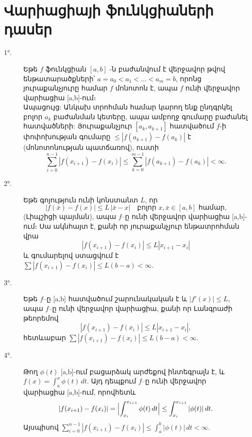 \documentclass[12pt]{article}
\begin{document}
\section{Վարիացիայի ֆունկցիաների դասեր}
\begin{description}
\item[1°.] Եթե \(f\) ֆունկցիան  \([a,b]\) -ն բաժանվում է վերջավոր թվով ենթատարածքների՝ \(a=a_0<a_1<\dots<a_m=b\), որոնց յուրաքանչյուրը համար \(f\) մոնոտոն է, ապա \(f\) ունի վերջավոր վարիացիա [a,b]-ում։ \\
Ապացույց: Անկախ տրոհման համար կարող ենք ընդգրկել բոլոր \(a_k\) բաժանման կետերը, ապա ամբողջ գումարը բաժանել հատվածների: Յուրաքանչյուր \([a_k,a_{k+1}]\) հատվածում \(f\)-ի փոփոխության գումարը \(\le |f(a_{k+1})-f(a_k)|\) է (մոնոտոնության պատճառով), ուստի
\[
\sum_{i=0}^{n-1}|f(x_{i+1})-f(x_i)| \le \sum_{k=0}^{m-1}|f(a_{k+1})-f(a_k)|<\infty.
\]
\item[2°.] Եթե գոյություն ունի կոնստանտ \(L\), որ
\[
\bigl|f(\bar x)-f(x)\bigr| \le L\,|\bar x - x|\quad\text{բոլոր }x,\bar x\in[a,b]\text{ համար,}
\]
(Լիպշիցի պայման), ապա \(f\)–ը ունի վերջավոր վարիացիա [a,b]-ում։
Սա ակնհայտ է, քանի որ յուրաքանչյուր ենթատրոհման վրա
\[
|f(x_{i+1})-f(x_i)| \le L|x_{i+1}-x_i|
\]
և գումարելով ստացվում է \(\sum |f(x_{i+1})-f(x_i)| \le L(b-a)<\infty\).
\item[3°.] Եթե \(f\)–ը [a,b] հատվածում շարունակական է և \(|f'(x)| \le L\), ապա \(f\)–ը ունի վերջավոր վարիացիա, քանի որ Լանգրաժի թեորեմով
\[
|f(x_{i+1})-f(x_i)| \le L|x_{i+1}-x_i|,
\]
հետևաբար \(\sum |f(x_{i+1})-f(x_i)| \le L(b-a)<\infty\).
\item[4°.] Թող \(\phi(t)\) [a,b]-ում բացարձակ արժեքով ինտեգրալն է, և \(f(x) = \int_a^x \phi(t)\,dt\). Այդ դեպքում \(f\)–ը ունի վերջավոր վարիացիա [a,b]-ում, որովհետև
\[
|f(x_{i+1})-f(x_i)| = \Bigl|\int_{x_i}^{x_{i+1}}\phi(t)\,dt\Bigr| \le \int_{x_i}^{x_{i+1}}|\phi(t)|\,dt.
\]
Այսպիսով
\(\sum_{i=0}^{n-1}|f(x_{i+1})-f(x_i)| \le \int_a^b|\phi(t)|\,dt<\infty\).
\end{description}
\end{document}
